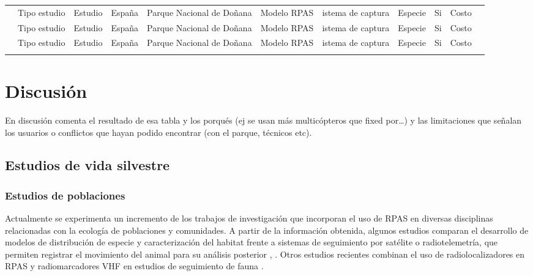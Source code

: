 \documentclass[11pt,]{article}
\begin{document}
\begin{sidewaystable}
\begin{tabular}{p{2.5cm}p{1cm}p{3cm}p{1cm}p{2cm}p{2cm}p{1cm}p{2cm}p{2cm}p{1cm}p{0.5cm}}
\cite{PazmanyMulero2015}  & Tipo estudio & Estudio & España & Parque Nacional de Doñana & Modelo RPAS & istema de captura & Especie & Si & Costo  \\ 
\cite{PazmanyMulero2015}  & Tipo estudio & Estudio & España & Parque Nacional de Doñana & Modelo RPAS  & istema de captura & Especie & Si & Costo  \\ 
\cite{PazmanyMulero2015}  & Tipo estudio & Estudio & España & Parque Nacional de Doñana & Modelo RPAS  & istema de captura & Especie & Si & Costo  \\ \\ \cmidrule(r){1-11}
\end{tabular}
\end{sidewaystable}

\section{Discusión}\label{discusion}

En discusión comenta el resultado de esa tabla y los porqués (ej se usan
más multicópteros que fixed por\ldots{}) y las limitaciones que señalan
los usuarios o conflictos que hayan podido encontrar (con el parque,
técnicos etc).

\subsection{Estudios de vida
silvestre}\label{estudios-de-vida-silvestre}

\subsubsection{Estudios de poblaciones}\label{estudios-de-poblaciones}

Actualmente se experimenta un incremento de los trabajos de
investigación que incorporan el uso de RPAS en diversas disciplinas
relacionadas con la ecología de poblaciones y comunidades. A partir de
la información obtenida, algunos estudios comparan el desarrollo de
modelos de distribución de especie y caracterización del habitat frente
a sistemas de seguimiento por satélite o radiotelemetría, que permiten
registrar el movimiento del animal para su análisis posterior
\citep{PazmanyMulero2015}, \citep{Mulero-Pazmany2015}. Otros estudios
recientes combinan el uso de radiolocalizadores en RPAS y
radiomarcadores VHF en estudios de seguimiento de fauna
\citep{Bayram2016}.
\end{document}
